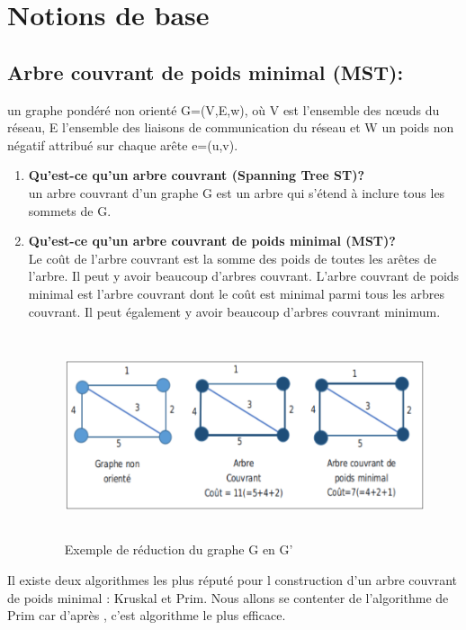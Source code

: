 \section{Notions de base}

\subsection{Arbre couvrant de poids minimal (MST):}
un graphe pondéré non orienté G=(V,E,w), où V est l’ensemble des nœuds du réseau, E l’ensemble des liaisons de communication du réseau et W un poids non négatif attribué sur chaque arête e=(u,v).


\begin{enumerate}[label=\alph*)]

	\item \textbf{Qu'est-ce qu'un arbre couvrant (Spanning Tree ST)?}\\
	un arbre couvrant d’un graphe G est un arbre qui s'étend à inclure tous les sommets de G.

	\item \textbf{Qu'est-ce qu'un arbre couvrant de poids minimal (MST)?}\\
	Le coût de l'arbre couvrant est la somme des poids de toutes les arêtes de l'arbre. Il peut y avoir beaucoup d'arbres couvrant. L’arbre couvrant de poids minimal est l'arbre couvrant dont le coût est minimal parmi tous les arbres couvrant. Il peut également y avoir beaucoup d'arbres couvrant minimum.

\begin{figure}[H]
	\centering
	\includegraphics[width=15cm,height=6cm]{Chap3/2.png}
	\caption{Exemple de réduction du graphe G en G’}
	\label{fig:32}
\end{figure}

\end{enumerate}
	
	
Il existe deux algorithmes les plus réputé pour l construction d’un arbre  couvrant de poids minimal :  Kruskal et Prim. Nous allons se contenter de l’algorithme de Prim car d’après \cite{prim1957shortest}, c’est algorithme le plus efficace.\\


